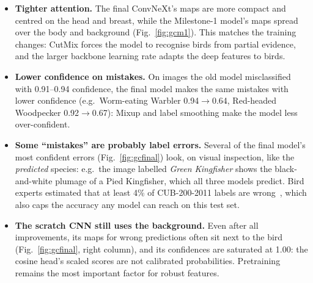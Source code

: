 \begin{itemize}
\item \textbf{Tighter attention.} The final ConvNeXt's maps are more compact and centred on the head and breast, while the Milestone-1
model's maps spread over the body and background (Fig.~\ref{fig:gcm1}). This matches the training changes: CutMix forces the model to
recognise birds from partial evidence, and the larger backbone learning rate adapts the deep features to birds.
\item \textbf{Lower confidence on mistakes.} On images the old model misclassified with 0.91--0.94 confidence, the final model makes the
same mistakes with lower confidence (e.g.\ Worm-eating Warbler 0.94$\rightarrow$0.64, Red-headed Woodpecker 0.92$\rightarrow$0.67): Mixup and
label smoothing make the model less over-confident.
\item \textbf{Some ``mistakes'' are probably label errors.} Several of the final model's most confident errors (Fig.~\ref{fig:gcfinal})
look, on visual inspection, like the \emph{predicted} species: e.g.\ the image labelled \emph{Green Kingfisher} shows the black-and-white
plumage of a Pied Kingfisher, which all three models predict. Bird experts estimated that at least 4\% of CUB-200-2011 labels are
wrong~\cite{vanhorn}, which also caps the accuracy any model can reach on this test set.
\item \textbf{The scratch CNN still uses the background.} Even after all improvements, its maps for wrong predictions often sit next to
the bird (Fig.~\ref{fig:gcfinal}, right column), and its confidences are saturated at 1.00: the cosine head's scaled scores are not
calibrated probabilities. Pretraining remains the most important factor for robust features.
\end{itemize}
